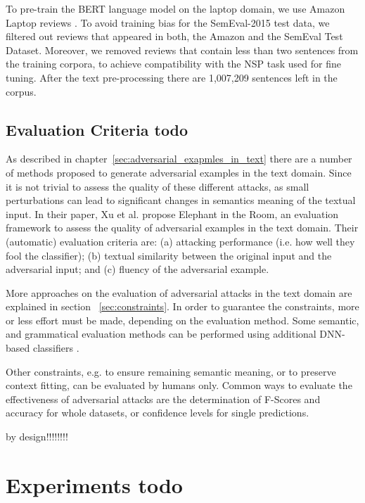To pre-train the BERT language model on the laptop domain, we use Amazon Laptop reviews \cite{he2016ups}. To avoid training bias for the SemEval-2015 test data, we filtered out reviews that appeared in both, the Amazon and the SemEval Test Dataset. Moreover, we removed reviews that contain less than two sentences from the training corpora, to achieve compatibility with the NSP task used for fine tuning. After the text pre-processing there are 1,007,209 sentences left in the corpus. 



\subsection{Evaluation Criteria todo}
    \label{sec:evaluation_tb}
As described in chapter~\ref{sec:adversarial_exapmles_in_text} there are a number of methods proposed to generate adversarial examples in the text domain. Since it is not trivial to assess the quality of these different attacks, as small perturbations can lead to significant changes in semantics meaning of the textual input. In their paper, Xu et al. propose Elephant in the Room, an evaluation framework to assess the quality of adversarial examples in the text domain\cite{xu2020elephant}. Their (automatic) evaluation criteria are:
(a) attacking performance (i.e. how well they fool the classifier); 
(b) textual similarity between the original input and the adversarial input; and
(c) fluency of the adversarial example.

More approaches on the evaluation of adversarial attacks in the text domain are explained in section ~\ref{sec:constraints}. In order to guarantee the constraints, more or less effort must be made, depending on the evaluation method. Some semantic, and grammatical evaluation methods can be performed using additional DNN-based classifiers \cite{ebrahimi2017hotflip, jin2019bert, garg2020bae}.

Other constraints, e.g. to ensure remaining semantic meaning, or to preserve context fitting, can be evaluated by humans only. 
Common ways to evaluate the effectiveness of adversarial attacks are the determination of F-Scores and accuracy for whole datasets, or confidence levels for single predictions. 

by design!!!!!!!!


\section{Experiments todo}
\label{sec:experiments}

